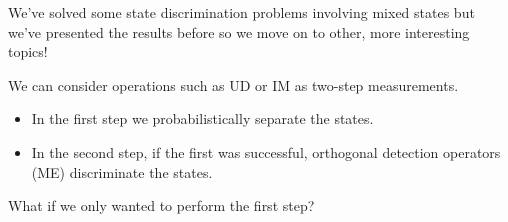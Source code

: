 \documentclass{beamer}
\begin{document}
\begin{frame}
We've solved some state discrimination problems involving mixed states but we've presented the results before so we move on to other,
more interesting topics!
\end{frame}

\begin{frame}
We can consider operations such as UD or IM as two-step measurements.  
\begin{itemize}
\item
In the first step we probabilistically separate the states.  
\item
In the second step, if the first was successful, orthogonal detection operators (ME) discriminate the states.
\end{itemize}
\[\]
What if we only wanted to perform the first step? 
\end{frame}

\end{document}
